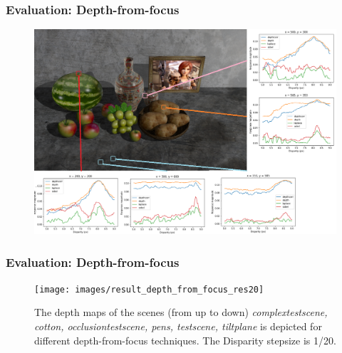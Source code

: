 \documentclass[11pt]{beamer}
\begin{document}
\begin{frame}
\frametitle{Evaluation: Depth-from-focus}
	\begin{figure}
	\centering
	\includegraphics[width=1\linewidth]{images/original_marked}
	\label{fig:originalmarked}
\end{figure}
\end{frame}

\begin{frame}
\frametitle{Evaluation: Depth-from-focus}
\begin{figure}
	\centering
	\texttt{[image: images/result\_depth\_from\_focus\_res20]}
	\caption[Depth from focus: depthmaps]{The depth maps of the scenes (from up to down) \textit{complextestscene, cotton, occlusiontestscene, pens, testscene, tiltplane} is depicted for different depth-from-focus techniques. The Disparity stepsize is 1/20.}
	\label{fig:resultdepthfromfocus}
\end{figure}
\end{frame}
\end{document}
